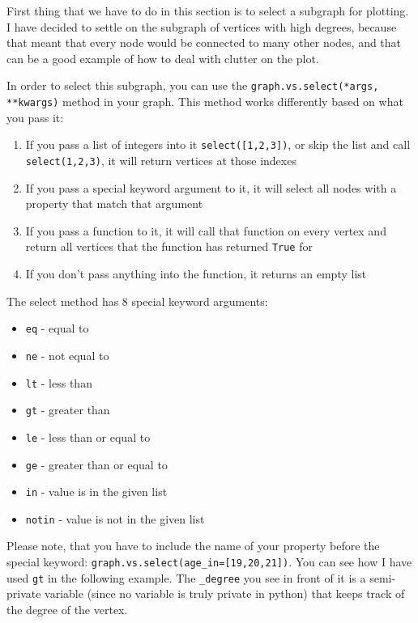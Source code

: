 \documentclass[12pt, a4paper]{article}
\begin{document}
First thing that we have to do in this section is to select a subgraph for plotting. I have decided to settle on the subgraph of vertices with high degrees, because that meant that every node would be connected to many other nodes, and that can be a good example of how to deal with clutter on the plot.

In order to select this subgraph, you can use the \texttt{graph.vs.select(*args, **kwargs)} method in your graph. This method works differently based on what you pass it:\newline

\begin{enumerate}
  \item If you pass a list of integers into it \texttt{select([1,2,3])}, or skip the list and call \texttt{select(1,2,3)}, it will return vertices at those indexes
  \item If you pass a special keyword argument to it, it will select all nodes with a property that match that argument
  \item If you pass a function to it, it will call that function on every vertex and return all vertices that the function has returned \texttt{True} for
  \item If you don't pass anything into the function, it returns an empty list
\end{enumerate}

The select method has 8 special keyword arguments:
\begin{multicols}{2}
  \begin{itemize}
  \item \texttt{eq} - equal to
  \item \texttt{ne} - not equal to
  \item \texttt{lt} - less than
  \item \texttt{gt} - greater than
  \item \texttt{le} - less than or equal to
  \item \texttt{ge} - greater than or equal to
  \item \texttt{in} - value is in the given list
  \item \texttt{notin} - value is not in the given list
  \end{itemize}
\end{multicols}

Please note, that you have to include the name of your property before the special keyword: \texttt{graph.vs.select(age\_in=[19,20,21])}. You can see how I have used \texttt{gt} in the following example. The \texttt{\_degree} you see in front of it is a semi-private variable (since no variable is truly private in python) that keeps track of the degree of the vertex.
\end{document}
